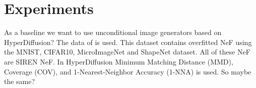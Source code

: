 \section{Experiments}
\label{sec:exper}
As a baseline we want to use unconditional image generators based on HyperDiffusion?
The data of \cite{papa2023train} is used. This dataset contains overfitted NeF using the
MNIST, CIFAR10, MicroImageNet and ShapeNet dataset. All of these NeF are SIREN NeF.
In HyperDiffusion Minimum Matching Distance (MMD), Coverage (COV), and 1-Nearest-Neighbor Accuracy (1-NNA) is
used. So maybe the same?